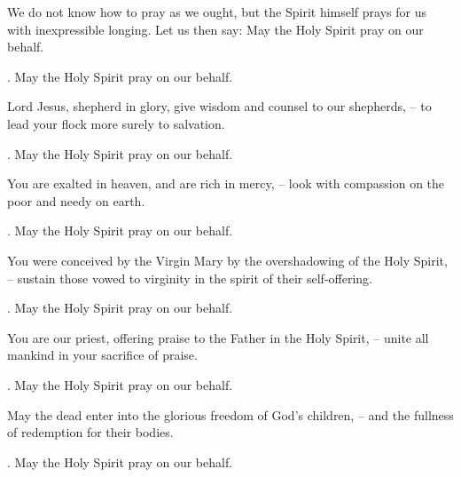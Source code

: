 \lettrine[loversize=0.15,lines=2]{W}{}e do not know how to pray as we ought, but the Spirit himself prays for us with inexpressible longing. Let us then say: May the Holy Spirit pray on our behalf.
\par \Rbar. May the Holy Spirit pray on our behalf.

Lord Jesus, shepherd in glory, give wisdom and counsel to our shepherds,
– to lead your flock more surely to salvation.
\par \Rbar. May the Holy Spirit pray on our behalf.

You are exalted in heaven, and are rich in mercy,
– look with compassion on the poor and needy on earth.
\par \Rbar. May the Holy Spirit pray on our behalf.

You were conceived by the Virgin Mary by the overshadowing of the Holy Spirit,
– sustain those vowed to virginity in the spirit of their self-offering.
\par \Rbar. May the Holy Spirit pray on our behalf.

You are our priest, offering praise to the Father in the Holy Spirit,
– unite all mankind in your sacrifice of praise.
\par \Rbar. May the Holy Spirit pray on our behalf.

May the dead enter into the glorious freedom of God’s children,
– and the fullness of redemption for their bodies.
\par \Rbar. May the Holy Spirit pray on our behalf.